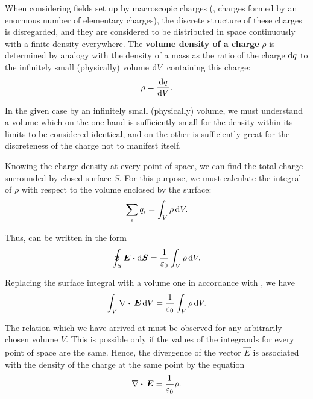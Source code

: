 When considering fields set up by macroscopic charges (\ie, charges formed by an enormous number of elementary charges), the discrete structure of these charges is disregarded, and they are considered to be distributed in space continuously with a finite density everywhere. The \textbf{volume density of a charge} $\rho$ is determined by analogy with the density of a mass as the ratio of the charge $\mathrm{d} q$ to the infinitely small (physically) volume $\mathrm{d} V$ containing this charge:
\begin{equation}\label{eq:1_115}
	\rho = \dfrac{\mathrm{d} q}{\mathrm{d} V}.
\end{equation}

\noindent
In the given case by an infinitely small (physically) volume, we must understand a volume which on the one hand is sufficiently small for the density within its limits to be considered identical, and on the other is sufficiently great for the discreteness of the charge not to manifest itself.

Knowing the charge density at every point of space, we can find the total charge surrounded by closed surface $S$. For this purpose, we must calculate the integral of $\rho$ with respect to the volume enclosed by the surface:
\begin{equation*}
	\sum_i q_i = \int_V \rho\,\mathrm{d} V.
\end{equation*}

\noindent
Thus,  can be written in the form
\begin{equation}\label{eq:1_116}
	\oint_S \boldsymbol{E}\boldsymbol{\cdot}\mathrm{d}\boldsymbol{S} = \frac{1}{\varepsilon_0} \int_V \rho\,\mathrm{d} V.
\end{equation}

Replacing the surface integral with a volume one in accordance with , we have
\begin{equation*}
	\int_V \nabla\boldsymbol{\cdot}\,\boldsymbol{E}\,\mathrm{d} V = \frac{1}{\varepsilon_0} \int_V \rho\,\mathrm{d} V.
\end{equation*}

\noindent
The relation which we have arrived at must be observed for any arbitrarily chosen volume $V$. This is possible only if the values of the integrands for every point of space are the same. Hence, the divergence of the vector $\vec{E}$ is associated with the density of the charge at the same point by the equation
\begin{equation}\label{eq:1_117}
	\nabla\boldsymbol{\cdot}\,\boldsymbol{E} = \frac{1}{\varepsilon_0} \rho.
\end{equation}

